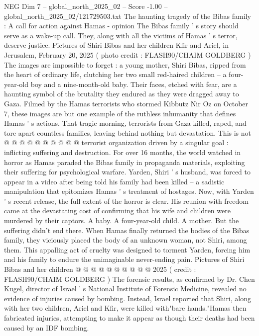 \begin{textsample}{NEG Dim 7 – global\_north\_2025\_02 – Score -1.00 – global\_north\_2025\_02/121729503.txt}  \label{ex:f7_neg_174}
The haunting tragedy of the Bibas family : A call for action against Hamas - opinion The Bibas family ' s story should serve as a wake-up call.
They, along with all the victims of Hamas ' s terror, deserve justice.
Pictures of Shiri Bibas and her children Kfir and Ariel, in Jerusalem, February 20, 2025 ( photo credit : FLASH90/CHAIM GOLDBERG ) The images are impossible to forget : a young mother, Shiri Bibas, ripped from the heart of ordinary life, clutching her two small red-haired children -- a four-year-old boy and a nine-month-old baby.
Their faces, etched with fear, are a haunting symbol of the brutality they endured as they were dragged away to Gaza.
Filmed by the Hamas terrorists who stormed Kibbutz Nir Oz on October 7, these images are but one example of the ruthless inhumanity that defines Hamas ' s actions.
That tragic morning, terrorists from Gaza killed, raped, and tore apart countless families, leaving behind nothing but devastation.
This is not @ @ @ @ @ @ @ @ @ @ terrorist organization driven by a singular goal : inflicting suffering and destruction.
For over 16 months, the world watched in horror as Hamas paraded the Bibas family in propaganda materials, exploiting their suffering for psychological warfare.
Yarden, Shiri ' s husband, was forced to appear in a video after being told his family had been killed -- a sadistic manipulation that epitomizes Hamas ' s treatment of hostages.
Now, with Yarden ' s recent release, the full extent of the horror is clear.
His reunion with freedom came at the devastating cost of confirming that his wife and children were murdered by their captors.
A baby.
A four-year-old child.
A mother.
But the suffering didn't end there.
When Hamas finally returned the bodies of the Bibas family, they viciously placed the body of an unknown woman, not Shiri, among them.
This appalling act of cruelty was designed to torment Yarden, forcing him and his family to endure the unimaginable never-ending pain.
Pictures of Shiri Bibas and her children @ @ @ @ @ @ @ @ @ @ 2025 ( credit : FLASH90/CHAIM GOLDBERG ) The forensic results, as confirmed by Dr.
Chen Kugel, director of Israel ' s National Institute of Forensic Medicine, revealed no evidence of injuries caused by bombing.
Instead, Israel reported that Shiri, along with her two children, Ariel and Kfir, were killed with"bare hands."Hamas then fabricated injuries, attempting to make it appear as though their deaths had been caused by an IDF bombing.

\end{textsample}
